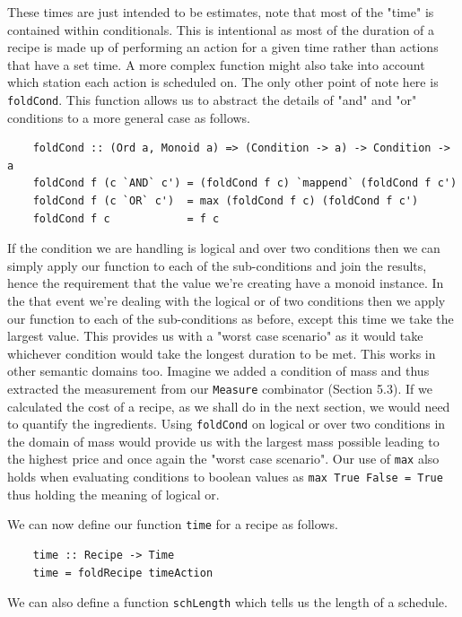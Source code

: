 \documentclass[11pt]{article}
\begin{document}
These times are just intended to be estimates, note that most of the "time" is contained within
conditionals. This is intentional as most of the duration of a recipe is made up of performing an
action for a given time rather than actions that have a set time. A more complex function might
also take into account which station each action is scheduled on. The only other point of note
here is \texttt{foldCond}. This function allows us to abstract the details of "and" and "or"
conditions to a more general case as follows.

\begin{lstlisting}
    foldCond :: (Ord a, Monoid a) => (Condition -> a) -> Condition -> a
    foldCond f (c `AND` c') = (foldCond f c) `mappend` (foldCond f c')
    foldCond f (c `OR` c')  = max (foldCond f c) (foldCond f c')
    foldCond f c            = f c
\end{lstlisting}

If the condition we are handling is logical and over two conditions then we can simply apply our function
to each of the sub-conditions and join the results, hence the requirement that the value we're
creating have a monoid instance. In the that event we're dealing with the logical or of two conditions then
we apply our function to each of the sub-conditions as before, except this time we take the largest value.
This provides us with a "worst case scenario" as it would take whichever condition would take the longest
duration to be met. This works in other semantic domains too. Imagine we added a condition of mass and thus
extracted the measurement from our \texttt{Measure} combinator (Section 5.3). If we calculated the cost of a recipe, as we shall
do in the next section, we would need to quantify the ingredients. Using \texttt{foldCond} on logical or over two
conditions in the domain of mass would provide us with the largest mass possible leading to the highest price and
once again the "worst case scenario". Our use of \texttt{max} also holds when evaluating conditions to boolean values
as \texttt{max True False = True} thus holding the meaning of logical or.

\medbreak

We can now define our function \texttt{time} for a recipe as follows.

\begin{lstlisting}
    time :: Recipe -> Time
    time = foldRecipe timeAction
\end{lstlisting}

We can also define a function \texttt{schLength} which tells us the length of a schedule.
\end{document}

